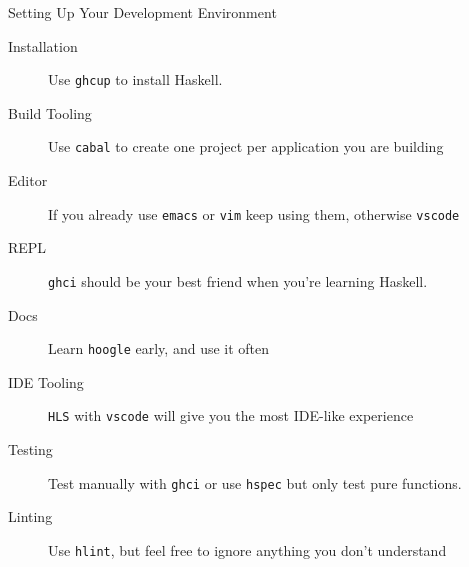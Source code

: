 \documentclass[10pt, presentation, colorlinks]{beamer}
\begin{document}
\begin{frame}[label={sec:orgc87ba00},fragile]{Setting Up Your Development Environment}
 \pause
\begin{description}
\item[{Installation}] Use \alert{\texttt{ghcup}} to install Haskell.
\end{description}
\pause
\begin{description}
\item[{Build Tooling}] Use \alert{\texttt{cabal}} to create one project per application you are building
\end{description}
\pause
\begin{description}
\item[{Editor}] If you already use \alert{\texttt{emacs}} or \alert{\texttt{vim}} keep using them, otherwise \alert{\texttt{vscode}}
\end{description}
\pause
\begin{description}
\item[{REPL}] \alert{\texttt{ghci}} should be your best friend when you're learning Haskell.
\end{description}
\pause
\begin{description}
\item[{Docs}] Learn \alert{\texttt{hoogle}} early, and use it often
\end{description}
\pause
\begin{description}
\item[{IDE Tooling}] \alert{\texttt{HLS}} with \alert{\texttt{vscode}} will give you the most IDE-like experience
\end{description}
\pause
\begin{description}
\item[{Testing}] Test manually with \alert{\texttt{ghci}} or use \alert{\texttt{hspec}} but only test pure functions.
\end{description}
\pause
\begin{description}
\item[{Linting}] Use \alert{\texttt{hlint}}, but feel free to ignore anything you don't understand
\end{description}
\end{frame}
\end{document}
